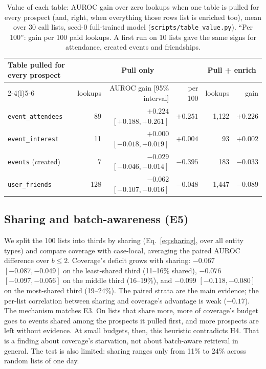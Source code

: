 \documentclass{article}
\begin{document}
\begin{table}[h]
  \centering
  \small
  \begin{tabular}{@{}lrrrrr@{}}
    \toprule
    Table pulled for every prospect & \multicolumn{3}{c}{Pull only} & \multicolumn{2}{c}{Pull + enrich} \\
    \cmidrule(lr){2-4}\cmidrule(l){5-6}
    & lookups & AUROC gain [95\% interval] & per 100 & lookups & gain \\
    \midrule
    \texttt{event\_attendees} & 89 & $+0.224$ $[+0.188, +0.261]$ & $+0.251$ & 1,122 & $+0.226$ \\
    \texttt{event\_interest} & 11 & $+0.000$ $[-0.018, +0.019]$ & $+0.004$ & 93 & $+0.002$ \\
    \texttt{events} (created) & 7 & $-0.029$ $[-0.046, -0.014]$ & $-0.395$ & 183 & $-0.033$ \\
    \texttt{user\_friends} & 128 & $-0.062$ $[-0.107, -0.016]$ & $-0.048$ & 1,447 & $-0.089$ \\
    \bottomrule
  \end{tabular}
  \caption{Value of each table: AUROC gain over zero lookups when one table is pulled for every prospect (and, right, when everything those rows list is enriched too), mean over 30 call lists, seed-0 full-trained model (\texttt{scripts/table\_value.py}). ``Per 100'': gain per 100 paid lookups. A first run on 10 lists gave the same signs for attendance, created events and friendships.}
  \label{tab:value}
\end{table}

\subsection{Sharing and batch-awareness (E5)}
We split the 100 lists into thirds by sharing (Eq.~\ref{eq:sharing}, over all entity types) and compare coverage with case-local, averaging the paired AUROC difference over $b \leq 2$. Coverage's deficit grows with sharing: $-0.067$ $[-0.087, -0.049]$ on the least-shared third (11--16\% shared), $-0.076$ $[-0.097, -0.056]$ on the middle third (16--19\%), and $-0.099$ $[-0.118, -0.080]$ on the most-shared third (19--24\%). The paired strata are the main evidence; the per-list correlation between sharing and coverage's advantage is weak ($-0.17$). The mechanism matches E3. On lists that share more, more of coverage's budget goes to events shared among the prospects it pulled first, and more prospects are left without evidence. At small budgets, then, this heuristic contradicts H4. That is a finding about coverage's starvation, not about batch-aware retrieval in general. The test is also limited: sharing ranges only from 11\% to 24\% across random lists of one day.
\end{document}

